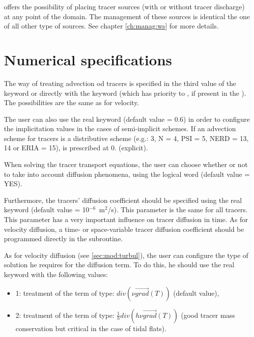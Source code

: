  offers the possibility of placing tracer sources
(with or without tracer discharge) at any point of the domain.
The management of these sources is identical the one of all other type of
sources.
See chapter \ref{ch:manag:ws} for more details.


\section{Numerical specifications}
\label{sec:num:spec}
The way of treating advection od tracers is specified in the third value
of the keyword  or directly with the keyword
 (which has priority to
, if present in the ).
The possibilities are the same as for velocity.

The user can also use the real keyword
 (default value = 0.6) in order to
configure the implicitation values in the cases of semi-implicit schemes.
If an advection scheme for tracers is a distributive scheme
(e.g.: 3, N = 4, PSI = 5, NERD = 13, 14 or ERIA = 15),
 is prescribed at 0. (explicit).

When solving the tracer transport equations, the user can choose
whether or not to take into account diffusion phenomena,
using the logical word 
(default value = YES).

Furthermore, the tracers' diffusion coefficient should be specified using
the real keyword 
(default value = 10$^{-6}$~m$^2$/s).
This parameter is the same for all tracers.
This parameter has a very important influence on tracer diffusion in time.
As for velocity diffusion, a time- or space-variable tracer diffusion
coefficient should be programmed directly in the  subroutine.

As for velocity diffusion (see \ref{sec:mod:turbul}), the user can configure
the type of solution he requires for the diffusion term.
To do this, he should use the real keyword
 with the following values:

\begin{itemize}
\item 1: treatment of the term of type:
$div\left(\nu \overrightarrow{grad}\left(T\right)\right)$
(default value),

\item 2: treatment of the term of type:
$\frac{1}{h}div\left(h \nu \overrightarrow{grad}\left(T\right)\right)$
(good tracer mass conservation but critical in the case of tidal flats).
\end{itemize}


